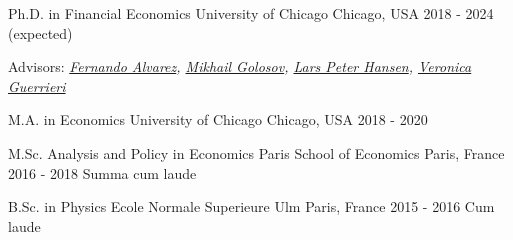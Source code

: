 

\begin{cventries}

	\cventry
	{Ph.D. in Financial Economics} %
	{University of Chicago} %
	{Chicago, USA} %
	{2018 - 2024 (expected)} %
	{\begin{cvitems}
			\item
		\end{cvitems}
	}
	{Advisors: \textit{\href{https://alvarezfernando.com/}{Fernando Alvarez}, \href{https://voices.uchicago.edu/golosov/contact/}{Mikhail Golosov}, \href{https://larspeterhansen.org/contact/}{Lars Peter Hansen}, \href{https://voices.uchicago.edu/veronicaguerrieri/contact/}{Veronica Guerrieri}}}

	\cventry
	{M.A. in Economics} %
	{University of Chicago} %
	{Chicago, USA} %
	{2018 - 2020} %

	\cventry
	{M.Sc. Analysis and Policy in Economics} %
	{Paris School of Economics} %
	{Paris, France} %
	{2016 - 2018} %
	{Summa cum laude}

	\cventry
	{B.Sc. in Physics} %
	{Ecole Normale Superieure Ulm} %
	{Paris, France} %
	{2015 - 2016} %
	{Cum laude}

\end{cventries}
